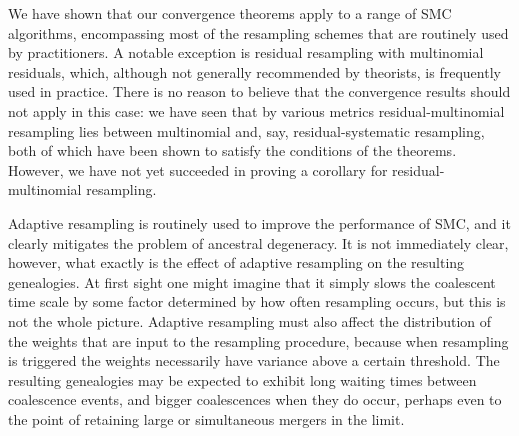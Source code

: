 We have shown that our convergence theorems apply to a range of SMC algorithms, encompassing most of the resampling schemes that are routinely used by practitioners. A notable exception is residual resampling with multinomial residuals, which, although not generally recommended by theorists, is frequently used in practice.
There is no reason to believe that the convergence results should not apply in this case: we have seen that by various metrics residual-multinomial resampling lies between multinomial and, say, residual-systematic resampling, both of which have been shown to satisfy the conditions of the theorems.
However, we have not yet succeeded in proving a corollary for residual-multinomial resampling.

Adaptive resampling is routinely used to improve the performance of SMC, and it clearly mitigates the problem of ancestral degeneracy. It is not immediately clear, however, what exactly is the effect of adaptive resampling on the resulting genealogies. At first sight one might imagine that it simply slows the coalescent time scale by some factor determined by how often resampling occurs, but this is not the whole picture. Adaptive resampling must also affect the distribution of the weights that are input to the resampling procedure, because when resampling is triggered the weights necessarily have variance above a certain threshold.
The resulting genealogies may be expected to exhibit long waiting times between coalescence events, and bigger coalescences when they do occur, perhaps even to the point of retaining large or simultaneous mergers in the limit.
